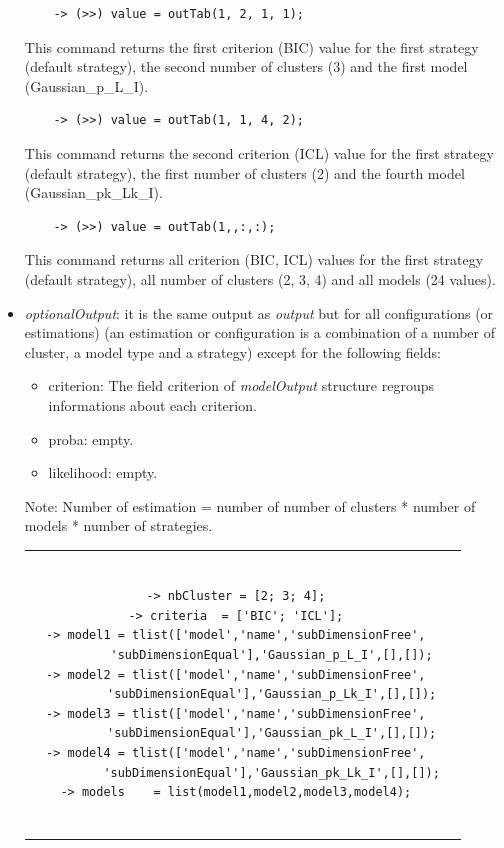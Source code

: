 \begin{itemize}
{\scriptsize
\begin{verbatim}
    -> (>>) value = outTab(1, 2, 1, 1);
\end{verbatim}}
\vspace{-0.4cm}
This command returns the first criterion (BIC) value for the first strategy (default strategy), the second number
of clusters (3) and the first model (Gaussian\_p\_L\_I).\\

{\scriptsize
\begin{verbatim}
    -> (>>) value = outTab(1, 1, 4, 2);
\end{verbatim}}
\vspace{-0.4cm}
This command returns the second criterion (ICL) value for the first strategy (default strategy), the first number
of clusters (2) and the fourth model (Gaussian\_pk\_Lk\_I).\\

{\scriptsize
\begin{verbatim}
    -> (>>) value = outTab(1,,:,:);
\end{verbatim}}
\vspace{-0.4cm}
This command returns all criterion (BIC, ICL) values for the first strategy (default strategy), all
number of clusters (2, 3, 4) and all models (24 values).\\


  \item {\em optionalOutput}: it is the same output as {\em output} but for all configurations (or estimations) (an estimation or configuration is a combination of a number of cluster, a model type and a strategy) except for the following fields:
\begin{itemize}
  \item criterion: The field criterion of {\em modelOutput} structure regroups informations about each criterion.
  \item proba: empty.
  \item likelihood: empty.
\end{itemize}

Note: Number of estimation = number of number of clusters * number of models * number of strategies.

\begin{tabular}{c|c}
\begin{minipage}[c]{0.48\columnwidth}%
{\scriptsize
\begin{verbatim}

-> nbCluster = [2; 3; 4];
-> criteria  = ['BIC'; 'ICL'];
-> model1 = tlist(['model','name','subDimensionFree',
          'subDimensionEqual'],'Gaussian_p_L_I',[],[]);
-> model2 = tlist(['model','name','subDimensionFree',
          'subDimensionEqual'],'Gaussian_p_Lk_I',[],[]);
-> model3 = tlist(['model','name','subDimensionFree',
          'subDimensionEqual'],'Gaussian_pk_L_I',[],[]);
-> model4 = tlist(['model','name','subDimensionFree',
          'subDimensionEqual'],'Gaussian_pk_Lk_I',[],[]);
-> models    = list(model1,model2,model3,model4);


\end{verbatim}}
\end{minipage}
\end{tabular}
\end{itemize}
